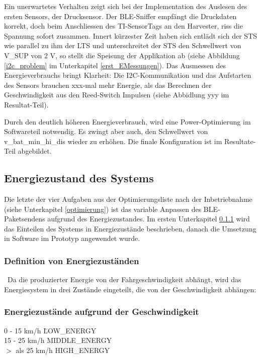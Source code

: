 Ein unerwartetes Verhalten zeigt sich bei der Implementation des Auslesen des ersten Sensors, der Drucksensor. Der BLE-Sniffer empfängt die Druckdaten korrekt, doch beim Anschliessen des TI-SensorTags an den Harvester, riss die Spannung sofort zusammen. Innert kürzester Zeit haben sich entlädt sich der STS wie parallel zu ihm der LTS und unterschreitet der STS den Schwellwert von V\_SUP von 2 V, so stellt die Speisung der Applikation ab (siehe Abbildung \ref{i2c_problem} im Unterkapitel \ref{erst_EMessungen}). Das Ausmessen des Energieverbrauchs bringt Klarheit: Die I2C-Kommunikation und das Aufstarten des Sensors brauchen xxx-mal mehr Energie, als das Berechnen der Geschwindigkeit aus den Reed-Switch Impulsen (siehe Abbidlung yyy im Resultat-Teil).

Durch den deutlich höheren Energieverbrauch, wird eine Power-Optimierung im Softwareteil notwendig. Es zwingt aber auch, den Schwellwert von v\_bat\_min\_hi\_dis  wieder zu erhöhen. Die finale Konfiguration ist im Resultate-Teil abgebildet.


\subsection{Energiezustand des Systems}
\label{v_energiezustand}

Die letzte der vier Aufgaben aus der Optimierungsliste nach der Inbetriebnahme (siehe Unterkapitel \ref{optimierung}) ist das variable Anpassen des BLE-Paketsendens aufgrund des Energiezustandes. Im ersten Unterkapitel \ref{def_zustaende} wird das Einteilen des Systems in Energiezustände beschrieben, danach die Umsetzung in Software im Prototyp angewendet wurde. 

\subsubsection{Definition von Energiezuständen}
\label{def_zustaende} 

\
Da die produzierter Energie von der Fahrgeschwindigkeit abhängt, wird das Energiesystem in drei Zustände eingeteilt, die von der Geschwindigkeit abhängen:

\subsubsection*{Energiezustände aufgrund der Geschwindigkeit}
\begin{tabbing}
   0 - 15 km/h      \quad\= LOW\_ENERGY   \\[0.8ex]
   15 - 25 km/h      \> MIDDLE\_ENERGY \\
   $>$ als 25 km/h   \> HIGH\_ENERGY\\
    
\end{tabbing}

